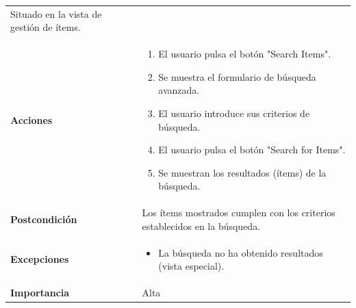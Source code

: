 \documentclass[
]{article}
\providecommand{\tightlist}{%
  \setlength{\itemsep}{0pt}\setlength{\parskip}{0pt}}
\begin{document}
\begin{longtable}[]{@{}ll@{}}
\begin{minipage}[t]{0.69\columnwidth}
Situado en la vista de gestión de ítems.\strut
\end{minipage}\tabularnewline
\begin{minipage}[t]{0.25\columnwidth}\raggedright
\textbf{Acciones}\strut
\end{minipage} & \begin{minipage}[t]{0.69\columnwidth}\raggedright
\begin{enumerate}
\def\labelenumi{\arabic{enumi}.}
\tightlist
\item
  El usuario pulsa el botón "Search Items".
\item
  Se muestra el formulario de búsqueda avanzada.
\item
  El usuario introduce sus criterios de búsqueda.
\item
  El usuario pulsa el botón "Search for Items".
\item
  Se muestran los resultados (ítems) de la búsqueda.
\end{enumerate}\strut
\end{minipage}\tabularnewline
\begin{minipage}[t]{0.25\columnwidth}\raggedright
\textbf{Postcondición}\strut
\end{minipage} & \begin{minipage}[t]{0.69\columnwidth}\raggedright
Los ítems mostrados cumplen con los criterios establecidos en la
búsqueda.\strut
\end{minipage}\tabularnewline
\begin{minipage}[t]{0.25\columnwidth}\raggedright
\textbf{Excepciones}\strut
\end{minipage} & \begin{minipage}[t]{0.69\columnwidth}\raggedright
\begin{itemize}
\tightlist
\item
  La búsqueda no ha obtenido resultados (vista especial).
\end{itemize}\strut
\end{minipage}\tabularnewline
\begin{minipage}[t]{0.25\columnwidth}\raggedright
\textbf{Importancia}\strut
\end{minipage} & \begin{minipage}[t]{0.69\columnwidth}\raggedright
Alta\strut
\end{minipage}\tabularnewline
\bottomrule
\end{longtable}
\end{document}
